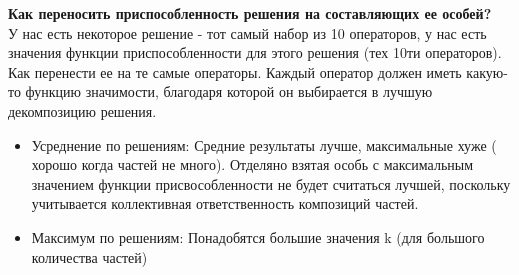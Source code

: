 \textbf{Как переносить приспособленность решения на составляющих ее особей?}\\
У нас есть некоторое решение - тот самый набор из 10 операторов, у нас есть значения функции приспособленности для этого решения (тех 10ти операторов). Как перенести ее на те самые операторы. Каждый оператор должен иметь какую-то функцию значимости, благодаря которой он выбирается в лучшую декомпозицию решения.
\begin{itemize}
    \item Усреднение по решениям: Средние результаты лучше, максимальные хуже ( хорошо когда частей не много). Отделяно взятая особь с максимальным значением функции присвособленности не будет считаться лучшей, поскольку учитывается коллективная ответственность композиций частей.
    \item Максимум по решениям: Понадобятся большие значения k (для большого количества  частей)
\end{itemize}
